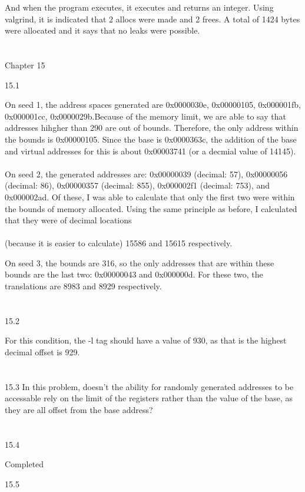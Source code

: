 \documentclass[12pt, a4paper]{article}
\begin{document}
	And when the program executes, it executes and returns an integer.
	Using valgrind, it is indicated that 2 allocs were made and 2 frees. A total of 1424 bytes were allocated and it says that no leaks were possible. \\ \\ \\

\noindent
Chapter 15

15.1

	On seed 1, the address spaces generated are 0x0000030e, 0x00000105, 0x000001fb, 0x000001cc, 0x0000029b.Because of the memory limit, we are able to say that addresses hihgher than 290 are out of bounds. Therefore, the only address within the bounds is 0x00000105. Since the base is 0x0000363c, the addition of the base and virtual addresses for this is about 0x00003741 (or a decmial value of 14145). \\ \\
	
	On seed 2, the generated addresses are: 0x00000039 (decimal:   57), 0x00000056 (decimal:   86), 0x00000357 (decimal:  855), 0x000002f1 (decimal:  753), and 0x000002ad. Of these, I was able to calculate that only the first two were within the bounds of memory allocated. Using the same principle as before, I calculated that they were of decimal locations \\ \\ (because it is easier to calculate) 15586 and 15615 respectively.

	On seed 3, the bounds are 316, so the only addresses that are within these bounds are the last two: 0x00000043 and 0x000000d. For these two, the translations are 8983 and 8929 respectively.\\ \\ \\
	
15.2

	For this condition, the -l tag should have a value of 930, as that is the highest decimal offset is 929. \\ \\ \\
	
15.3
	In this problem, doesn't the ability for randomly generated addresses to be accessable rely on the limit of the registers rather than the value of the base, as they are all offset from the base address? \\ \\ \\

15.4

	Completed 

15.5
\end{document}

